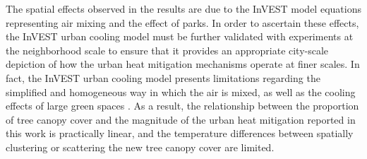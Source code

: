 \documentclass[10pt,letterpaper]{article}
\begin{document}
The spatial effects observed in the results are due to the InVEST model equations representing air mixing and the effect of parks. In order to ascertain these effects, the InVEST urban cooling model must be further validated with experiments at the neighborhood scale to ensure that it provides an appropriate city-scale depiction of how the urban heat mitigation mechanisms operate at finer scales.
In fact, the InVEST urban cooling model presents limitations regarding the simplified and homogeneous way in which the air is mixed, as well as the cooling effects of large green spaces \cite{sharp2020invest,bosch2020spatially}.
As a result, the relationship between the proportion of tree canopy cover and the magnitude of the urban heat mitigation reported in this work is practically linear, and the temperature differences between spatially clustering or scattering the new tree canopy cover are limited.
\end{document}
